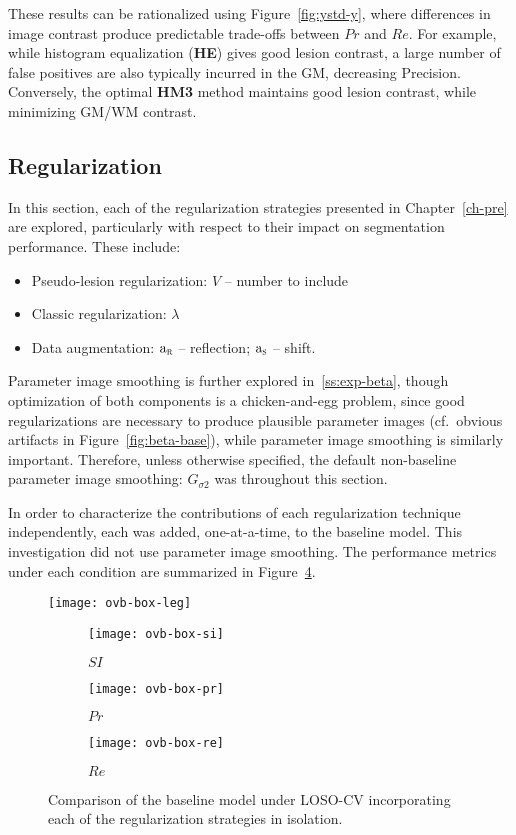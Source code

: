 These results can be rationalized using Figure~\ref{fig:ystd-y},
where differences in image contrast produce predictable trade-offs between $Pr$ and $Re$.%
For example, while histogram equalization (\textbf{HE}) gives good lesion contrast,
a large number of false positives are also typically incurred in the GM,
decreasing Precision.
Conversely, the optimal \textbf{HM3} method maintains good lesion contrast,
while minimizing GM/WM contrast.
\subsection{Regularization}\label{ss:exp-reg}
In this section, each of the regularization strategies
presented in Chapter~\ref{ch-pre} are explored,
particularly with respect to their impact on segmentation performance.
These include:
\begin{itemize}[itemsep=0pt,topsep=0pt]
  \item Pseudo-lesion regularization: $V$ -- number to include
  \item Classic regularization: $\lambda$
  \item Data augmentation:
    $\mathrm{a}_{\textsc{r}}$ -- reflection;
    $\mathrm{a}_{\textsc{s}}$ -- shift.
\end{itemize}
Parameter image smoothing is further explored in~\ref{ss:exp-beta},
though optimization of both components is a chicken-and-egg problem,
since good regularizations are necessary to produce plausible parameter images
(cf.~obvious artifacts in Figure~\ref{fig:beta-base}),
while parameter image smoothing is similarly important.
Therefore, unless otherwise specified,
the default non-baseline parameter image smoothing: $G_{\sigma2}$ was throughout this section.
\par
In order to characterize the contributions of each regularization technique independently,
each was added, one-at-a-time, to the baseline model.
This investigation did not use parameter image smoothing.
The performance metrics under each condition are summarized in Figure~\ref{fig:seg-box-ovb}.
\par
\begin{figure}
  \centering
  \texttt{[image: ovb-box-leg]}\\[0.5em]
  \begin{subfigure}{0.32\textwidth}
    \centering\texttt{[image: ovb-box-si]}
    \caption{$SI$}%
    \label{fig:seg-box-ovb-si}
  \end{subfigure}
  \begin{subfigure}{0.32\textwidth}
    \centering\texttt{[image: ovb-box-pr]}
    \caption{$Pr$}%
    \label{fig:seg-box-ovb-pr}
  \end{subfigure}
  \begin{subfigure}{0.32\textwidth}
    \centering\texttt{[image: ovb-box-re]}
    \caption{$Re$}%
    \label{fig:seg-box-ovb-re}
  \end{subfigure}
  \caption{Comparison of the baseline model under LOSO-CV
    incorporating each of the regularization strategies in isolation.}%
  \label{fig:seg-box-ovb}
\end{figure}
